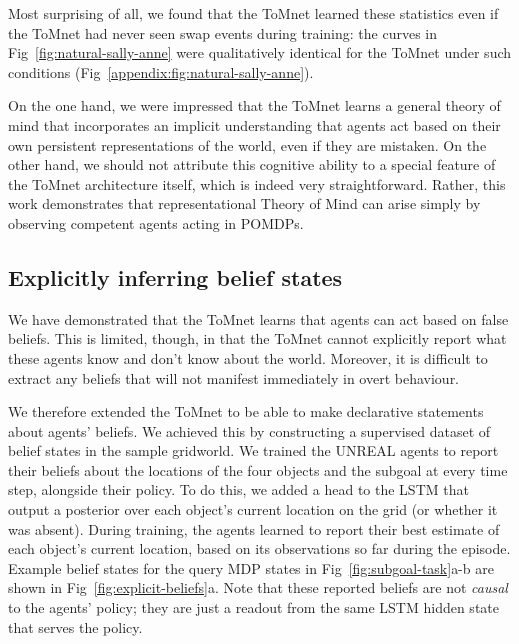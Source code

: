 \documentclass{article}
\begin{document}
Most surprising of all, we found that the ToMnet learned these statistics even if the ToMnet had never seen swap events during training: the curves in Fig~\ref{fig:natural-sally-anne} were qualitatively identical for the ToMnet under such conditions (Fig~\ref{appendix:fig:natural-sally-anne}).

On the one hand, we were impressed that the ToMnet learns a general theory of mind that incorporates an implicit understanding that agents act based on their own persistent representations of the world, even if they are mistaken. On the other hand, we should not attribute this cognitive ability to a special feature of the ToMnet architecture itself, which is indeed very straightforward. Rather, this work demonstrates that representational Theory of Mind can arise simply by observing competent agents acting in POMDPs.


\subsection{Explicitly inferring belief states}
\label{section:explicit-beliefs}

We have demonstrated that the ToMnet learns that agents can act based on false beliefs. This is limited, though, in that the ToMnet cannot explicitly report what these agents know and don't know about the world. Moreover, it is difficult to extract any beliefs that will not manifest immediately in overt behaviour.

We therefore extended the ToMnet to be able to make declarative statements about agents' beliefs. We achieved this by constructing a supervised dataset of belief states in the sample gridworld. We trained the UNREAL agents to report their beliefs about the locations of the four objects and the subgoal at every time step, alongside their policy. To do this, we added a head to the LSTM that output a posterior over each object's current location on the grid (or whether it was absent). During training, the agents learned to report their best estimate of each object's current location, based on its observations so far during the episode. Example belief states for the query MDP states in Fig~\ref{fig:subgoal-task}a-b are shown in Fig~\ref{fig:explicit-beliefs}a. Note that these reported beliefs are not {\it causal} to the agents' policy; they are just a readout from the same LSTM hidden state that serves the policy.
\end{document}
